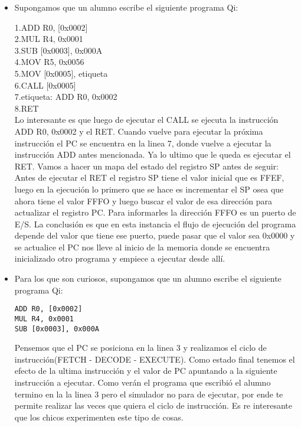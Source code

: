 \begin{itemize}

\item Supongamos que un alumno escribe el siguiente programa Qi:

1.ADD R0, [0x0002]\\
2.MUL R4, 0x0001 \\
3.SUB [0x0003], 0x000A \\
4.MOV R5, 0x0056 \\
5.MOV [0x0005], etiqueta \\
6.CALL [0x0005] \\
7.etiqueta: ADD R0, 0x0002 \\
8.RET \\

Lo interesante es que luego de ejecutar el CALL se ejecuta la instrucción ADD R0, 0x0002 y el RET. Cuando vuelve para ejecutar la próxima instrucción el PC se encuentra en la linea 7, donde vuelve a ejecutar la instrucción ADD antes mencionada. Ya lo ultimo que le queda es ejecutar el RET.
Vamos a hacer un mapa del estado del registro SP antes de seguir: Antes de ejecutar el RET  el registro SP tiene el valor inicial que es FFEF, luego en la ejecución lo primero que se hace es incrementar el SP osea que ahora tiene el valor FFFO y luego buscar el valor de esa dirección para actualizar el registro PC. Para informarles la dirección FFFO es un puerto de E/S. La conclusión es que en esta instancia el flujo de ejecución del programa depende del valor que tiene ese puerto, puede pasar que el valor sea 0x0000 y se actualice el PC nos lleve al inicio de la memoria donde se encuentra inicializado otro programa y empiece a ejecutar desde allí. 


\item Para los que son curiosos, supongamos que un alumno escribe el siguiente programa Qi:
\begin{verbatim}
ADD R0, [0x0002]
MUL R4, 0x0001
SUB [0x0003], 0x000A 
\end{verbatim}

Pensemos que el PC se posiciona en la linea 3 y realizamos el ciclo de instrucción(FETCH - DECODE - EXECUTE). Como estado final tenemos el efecto de la ultima instrucción y el valor de PC apuntando a la siguiente instrucción a ejecutar. Como verán el programa que escribió el alumno termino en la la linea 3 pero el simulador no para de ejecutar, por ende te permite realizar las veces que quiera el ciclo de instrucción. Es re interesante que los chicos experimenten este tipo de cosas.

\end{itemize} 

